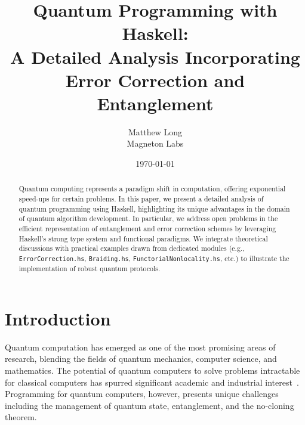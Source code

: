 \documentclass[12pt]{article}
\title{Quantum Programming with Haskell: \\ A Detailed Analysis Incorporating Error Correction and Entanglement}
\author{Matthew Long \\
Magneton Labs}
\date{\today}
\begin{document}
\maketitle

\begin{abstract}
Quantum computing represents a paradigm shift in computation, offering exponential speed-ups for certain problems. In this paper, we present a detailed analysis of quantum programming using Haskell, highlighting its unique advantages in the domain of quantum algorithm development. In particular, we address open problems in the efficient representation of entanglement and error correction schemes by leveraging Haskell's strong type system and functional paradigms. We integrate theoretical discussions with practical examples drawn from dedicated modules (e.g., \texttt{ErrorCorrection.hs}, \texttt{Braiding.hs}, \texttt{FunctorialNonlocality.hs}, etc.) to illustrate the implementation of robust quantum protocols.
\end{abstract}

\tableofcontents
\newpage

\section{Introduction}
Quantum computation has emerged as one of the most promising areas of research, blending the fields of quantum mechanics, computer science, and mathematics. The potential of quantum computers to solve problems intractable for classical computers has spurred significant academic and industrial interest~\cite{nielsen2000quantum}. Programming for quantum computers, however, presents unique challenges including the management of quantum state, entanglement, and the no-cloning theorem.
\end{document}
